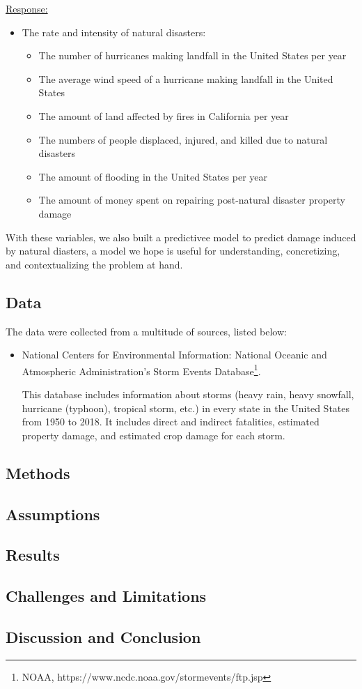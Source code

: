 \documentclass[10pt,]{article}
\let\rmarkdownfootnote\footnote%
\def\footnote{\protect\rmarkdownfootnote}
\begin{document}
\underline{Response:}

\begin{itemize}
  \item The rate and intensity of natural disasters:
  \begin{itemize}
    \item The number of hurricanes making landfall in the United States per year
    \item The average wind speed of a hurricane making landfall in the United States
    \item The amount of land affected by fires in California per year
    \item The numbers of people displaced, injured, and killed due to natural disasters
    \item The amount of flooding in the United States per year
    \item The amount of money spent on repairing post-natural disaster property damage
  \end{itemize}
\end{itemize}

With these variables, we also built a predictivee model to predict
damage induced by natural diasters, a model we hope is useful for
understanding, concretizing, and contextualizing the problem at hand.

\subsection{Data}\label{data}

The data were collected from a multitude of sources, listed below:

\begin{itemize}
  \item National Centers for Environmental Information: National Oceanic and Atmospheric Administration's Storm Events Database\footnote{NOAA, https://www.ncdc.noaa.gov/stormevents/ftp.jsp}.
  
  This database includes information about storms (heavy rain, heavy snowfall, hurricane (typhoon), tropical storm, etc.) in every state in the United States from 1950 to 2018. It includes direct and indirect fatalities, estimated property damage, and estimated crop damage for each storm.
\end{itemize}

\subsection{Methods}\label{methods}

\subsection{Assumptions}\label{assumptions}

\subsection{Results}\label{results}

\subsection{Challenges and
Limitations}\label{challenges-and-limitations}

\subsection{Discussion and Conclusion}\label{discussion-and-conclusion}
\end{document}
